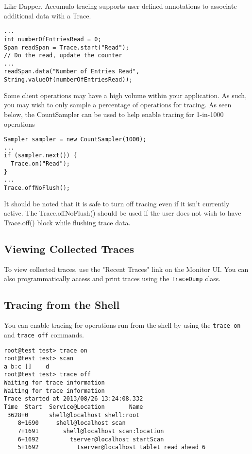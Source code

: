 Like Dapper, Accumulo tracing supports user defined annotations to associate additional data with a Trace.
\begingroup\fontsize{8pt}{8pt}\selectfont\begin{verbatim}
...
int numberOfEntriesRead = 0;
Span readSpan = Trace.start("Read");
// Do the read, update the counter
...
readSpan.data("Number of Entries Read", String.valueOf(numberOfEntriesRead));
\end{verbatim}\endgroup

Some client operations may have a high volume within your
application. As such, you may wish to only sample a percentage of
operations for tracing. As seen below, the CountSampler can be used to
help enable tracing for 1-in-1000 operations
\begingroup\fontsize{8pt}{8pt}\selectfont\begin{verbatim}
Sampler sampler = new CountSampler(1000);
...
if (sampler.next()) {
  Trace.on("Read");
}
...
Trace.offNoFlush();
\end{verbatim}\endgroup

It should be noted that it is safe to turn off tracing even if it
isn't currently active. The Trace.offNoFlush() should be used if the
user does not wish to have Trace.off() block while flushing trace
data.

\subsection{Viewing Collected Traces}
To view collected traces, use the "Recent Traces" link on the Monitor
UI. You can also programmatically access and print traces using the
\texttt{TraceDump} class.

\subsection{Tracing from the Shell}
You can enable tracing for operations run from the shell by using the
\texttt{trace on} and \texttt{trace off} commands.

\begingroup\fontsize{8pt}{8pt}\selectfont\begin{verbatim}
root@test test> trace on
root@test test> scan
a b:c []    d
root@test test> trace off
Waiting for trace information
Waiting for trace information
Trace started at 2013/08/26 13:24:08.332
Time  Start  Service@Location       Name
 3628+0      shell@localhost shell:root
    8+1690     shell@localhost scan
    7+1691       shell@localhost scan:location
    6+1692         tserver@localhost startScan
    5+1692           tserver@localhost tablet read ahead 6
\end{verbatim}\endgroup

